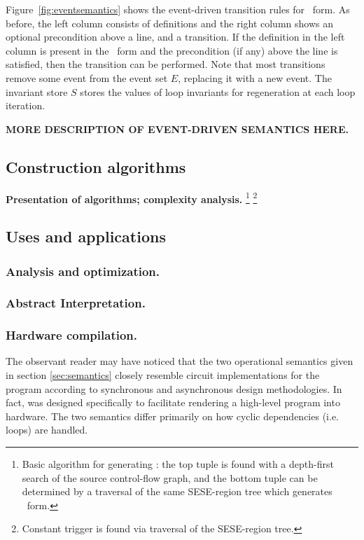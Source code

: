 \documentclass[12pt,titlepage,twoside]{article}
\begin{document}
Figure~\vref{fig:eventsemantics} shows the event-driven transition
rules for \ssiplus\ form.  As before, the left column consists of
definitions and the right column shows an optional precondition above
a line, and a transition.  If the definition in the left column is
present in the \ssiplus\ form and the precondition (if any) above the
line is satisfied, then the transition can be performed.  Note that
most transitions remove some event from the event set $E$, replacing
it with a new event.  The invariant store $S$ stores
the values of loop invariants for regeneration at each loop iteration.

\textbf{MORE DESCRIPTION OF EVENT-DRIVEN SEMANTICS HERE.}

\subsection{Construction algorithms}
\textbf{Presentation of algorithms; complexity analysis.}
\footnote{Basic algorithm for generating : the top
tuple is found with a depth-first search of the source
control-flow graph, and the bottom tuple can be determined by a
traversal of the same SESE-region tree which generates \ssizero\
form.}
\footnote{Constant trigger is found via traversal of the SESE-region tree.}

\subsection{Uses and applications}
\subsubsection{Analysis and optimization.}
\subsubsection{Abstract Interpretation.}
\subsubsection{Hardware compilation.}\label{sec:hardware}
The observant reader may have noticed that the two 
operational semantics given in section \ref{sec:semantics} closely
resemble circuit implementations for the program according to
synchronous and asynchronous design methodologies.  In fact,
\ssiplus{} was designed specifically to facilitate rendering a
high-level program into hardware.  The two semantics differ primarily
on how cyclic dependencies (i.e. loops) are handled.
\end{document}
